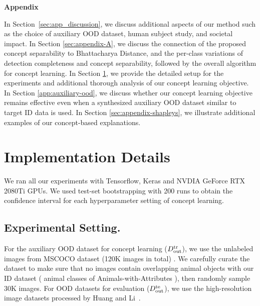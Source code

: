 \newpage
\appendix
\onecolumn
\begin{center}
	\textbf{\LARGE Appendix }
\end{center}

In Section~\ref{sec:app_discussion}, we discuss additional aspects of our method such as the choice of auxiliary OOD dataset, human subject study, and societal impact.
In Section \ref{sec:appendix-A}, we discuss the connection of the proposed concept separability to Bhattacharya Distance, and the per-class variations of detection completeness and concept separability, followed by the overall algorithm for concept learning.
In Section \ref{sec:appendix-implementation-details}, we provide the detailed setup for the experiments and additional thorough analysis of our concept learning objective.
In Section \ref{app:auxiliary-ood}, we discuss whether our concept learning objective remains effective even when a synthesized auxiliary OOD dataset similar to target ID data is used.
In Section \ref{sec:appendix-shapleys}, we illustrate additional examples of our concept-based explanations.





\section{Implementation Details}
\label{sec:appendix-implementation-details}
We ran all our experiments with Tensorflow, Keras and NVDIA GeForce RTX 2080Ti GPUs. We used test-set bootstrapping with 200 runs to obtain the confidence interval for each hyperparameter setting of concept learning.

\subsection{Experimental Setting.}
For the auxiliary OOD dataset for concept learning ($D_{\textrm{out}}^{\textrm{tr}}$), we use the unlabeled images from MSCOCO dataset (120K images in total) \cite{lin2014mscoco}. We carefully curate the dataset to make sure that no images contain overlapping animal objects with our ID dataset ( animal classes of Animals-with-Attributes \cite{xian2018awa}), then randomly sample 30K images.
For OOD datasets for evaluation ($D_{\textrm{out}}^{\textrm{te}}$), we use the high-resolution image datasets processed by Huang and Li~\cite{Huang_MOS}.


